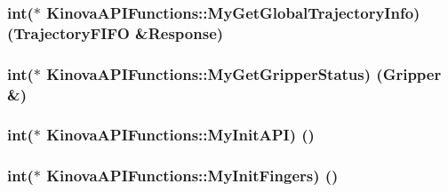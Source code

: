\subsubsection[{\texorpdfstring{My\+Get\+Global\+Trajectory\+Info}{MyGetGlobalTrajectoryInfo}}]{\setlength{\rightskip}{0pt plus 5cm}int($\ast$ Kinova\+A\+P\+I\+Functions\+::\+My\+Get\+Global\+Trajectory\+Info) (Trajectory\+F\+I\+FO \&Response)}\hypertarget{classKinovaAPIFunctions_a715a78b82f9e65326f9b66f01287fe2a}{}\label{classKinovaAPIFunctions_a715a78b82f9e65326f9b66f01287fe2a}
\subsubsection[{\texorpdfstring{My\+Get\+Gripper\+Status}{MyGetGripperStatus}}]{\setlength{\rightskip}{0pt plus 5cm}int($\ast$ Kinova\+A\+P\+I\+Functions\+::\+My\+Get\+Gripper\+Status) (Gripper \&)}\hypertarget{classKinovaAPIFunctions_afe0b617d9f8582ff8686ed9fb37ef579}{}\label{classKinovaAPIFunctions_afe0b617d9f8582ff8686ed9fb37ef579}
\subsubsection[{\texorpdfstring{My\+Init\+A\+PI}{MyInitAPI}}]{\setlength{\rightskip}{0pt plus 5cm}int($\ast$ Kinova\+A\+P\+I\+Functions\+::\+My\+Init\+A\+PI) ()}\hypertarget{classKinovaAPIFunctions_aed994a06c982ab33373f9fd675f8c47a}{}\label{classKinovaAPIFunctions_aed994a06c982ab33373f9fd675f8c47a}
\subsubsection[{\texorpdfstring{My\+Init\+Fingers}{MyInitFingers}}]{\setlength{\rightskip}{0pt plus 5cm}int($\ast$ Kinova\+A\+P\+I\+Functions\+::\+My\+Init\+Fingers) ()}\hypertarget{classKinovaAPIFunctions_a0890b09eaaa7c0778e21859f77ddc542}{}\label{classKinovaAPIFunctions_a0890b09eaaa7c0778e21859f77ddc542}
